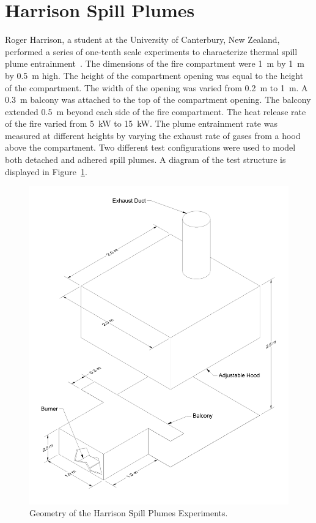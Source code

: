 \section{Harrison Spill Plumes}

Roger Harrison, a student at the University of Canterbury, New Zealand, performed a series of one-tenth scale experiments to characterize thermal spill plume entrainment~\cite{Harrison:2009,Harrison:IAFSS2008,Harrison:FT2007,Harrison:FSJ2010}. The dimensions of the fire compartment were 1~m by 1~m by 0.5~m high.  The height of the compartment opening was equal to the height of the compartment. The width of the opening was varied from 0.2~m to 1~m.  A 0.3~m balcony was attached to the top of the compartment opening. The balcony extended 0.5~m beyond each side of the fire compartment.  The heat release rate of the fire varied from 5~kW to 15~kW.
The plume entrainment rate was measured at different heights by varying the exhaust rate of gases from a hood above the compartment.
Two different test configurations were used to model both detached and adhered spill plumes. A diagram of the test structure is displayed in Figure~\ref{Harrison_Drawing}.

\begin{figure}[p]
\includegraphics[width=\textwidth]{FIGURES/Harrison_Spill_Plumes/Harrison_Spill_Plumes_Drawing}
\caption{Geometry of the Harrison Spill Plumes Experiments.}
\label{Harrison_Drawing}
\end{figure}




